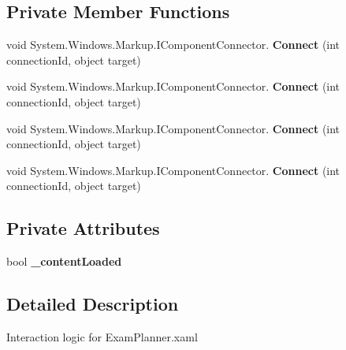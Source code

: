 \subsection*{Private Member Functions}
\begin{DoxyCompactItemize}
\item 
\mbox{\label{class_t_h_b___plugin___exams_1_1_exam_planner_a962a9efa9aaa49f756df8f7d4aed664d}} 
void System.\+Windows.\+Markup.\+I\+Component\+Connector. {\bfseries Connect} (int connection\+Id, object target)
\item 
\mbox{\label{class_t_h_b___plugin___exams_1_1_exam_planner_a962a9efa9aaa49f756df8f7d4aed664d}} 
void System.\+Windows.\+Markup.\+I\+Component\+Connector. {\bfseries Connect} (int connection\+Id, object target)
\item 
\mbox{\label{class_t_h_b___plugin___exams_1_1_exam_planner_a962a9efa9aaa49f756df8f7d4aed664d}} 
void System.\+Windows.\+Markup.\+I\+Component\+Connector. {\bfseries Connect} (int connection\+Id, object target)
\item 
\mbox{\label{class_t_h_b___plugin___exams_1_1_exam_planner_a962a9efa9aaa49f756df8f7d4aed664d}} 
void System.\+Windows.\+Markup.\+I\+Component\+Connector. {\bfseries Connect} (int connection\+Id, object target)
\end{DoxyCompactItemize}
\subsection*{Private Attributes}
\begin{DoxyCompactItemize}
\item 
\mbox{\label{class_t_h_b___plugin___exams_1_1_exam_planner_a64434a4c2701b50cf43bd4d1c83bbd56}} 
bool {\bfseries \+\_\+content\+Loaded}
\end{DoxyCompactItemize}


\subsection{Detailed Description}
Interaction logic for Exam\+Planner.\+xaml 

